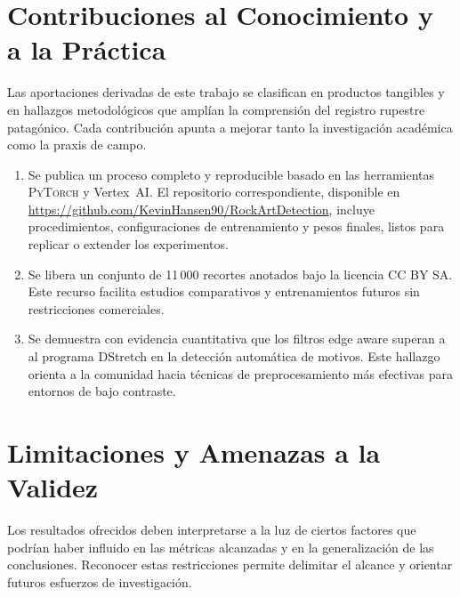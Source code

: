 \section{Contribuciones al Conocimiento y a la Práctica}

Las aportaciones derivadas de este trabajo se clasifican en productos tangibles y en hallazgos metodológicos que amplían la comprensión del registro rupestre patagónico.
Cada contribución apunta a mejorar tanto la investigación académica como la praxis de campo.

\begin{enumerate}
  \item Se publica un proceso completo y reproducible basado en las herramientas \textsc{PyTorch} y Vertex~AI.
        El repositorio correspondiente, disponible en \url{https://github.com/KevinHansen90/RockArtDetection}, incluye procedimientos, configuraciones de entrenamiento y pesos finales, listos para replicar o extender los experimentos.


  \item Se libera un conjunto de 11\,000 recortes anotados bajo la licencia CC BY SA.
        Este recurso facilita estudios comparativos y entrenamientos futuros sin restricciones comerciales.

  \item Se demuestra con evidencia cuantitativa que los filtros edge aware superan a al programa DStretch en la detección automática de motivos.
        Este hallazgo orienta a la comunidad hacia técnicas de preprocesamiento más efectivas para entornos de bajo contraste.
\end{enumerate}

\section{Limitaciones y Amenazas a la Validez}

Los resultados ofrecidos deben interpretarse a la luz de ciertos factores que podrían haber influido en las métricas alcanzadas y en la generalización de las conclusiones.
Reconocer estas restricciones permite delimitar el alcance y orientar futuros esfuerzos de investigación.

